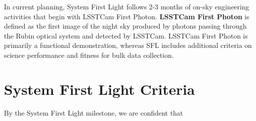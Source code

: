 \documentclass[SE,authoryear,toc]{lsstdoc}
\begin{document}
In current planning, System First Light follows 2-3 months of on-sky engineering activities that begin with LSSTCam First Photon.
\textbf {LSSTCam First Photon} is defined as the first image of the night sky produced by photons passing through the Rubin optical system and detected by LSSTCam.
LSSTCam First Photon is primarily a functional demonstration, whereas SFL includes additional criteria on science performance and fitness for bulk data collection.

\section{System First Light Criteria}
\label{criteria}

By the System First Light milestone, we are confident that
\end{document}
